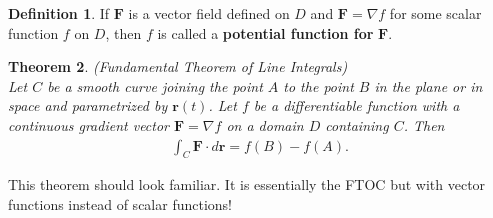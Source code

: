 \documentclass[12pt, letter]{article}
\theoremstyle{plain}
\newtheorem{theorem}{Theorem}
\numberwithin{theorem}{section}
\theoremstyle{definition}
\newtheorem{definition}[theorem]{Definition}
\begin{document}
\bigskip

\hrulefill

\bigskip

\begin{definition}
If $\bm{F}$ is a vector field defined on $D$ and $\bm{F} = \nabla f$ for some scalar function $f$ on $D$, then $f$ is called a \textbf{potential function for} $\bm{F}$.
\end{definition}

\bigskip

\hrulefill

\bigskip

\begin{theorem}{(Fundamental Theorem of Line Integrals)}
\\
Let $C$ be a smooth curve joining the point $A$ to the point $B$ in the plane or in space and parametrized by $\bm{r}(t)$. Let $f$ be a differentiable function with a continuous gradient vector $\bm{F} = \nabla f$ on a domain $D$ containing $C$. Then
\begin{align*}
\int_C \bm{F}\cdot d\bm{r} = f(B) - f(A).
\end{align*}
\end{theorem}

\bigskip

This theorem should look familiar. It is essentially the FTOC but with vector functions instead of scalar functions!

\bigskip

\hrulefill

\bigskip
\end{document}
